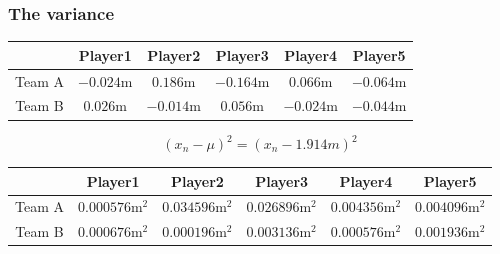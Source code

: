\documentclass[aspectratio=169]{beamer}
\begin{document}
\begin{frame}
    \frametitle{The variance}

    \centering
    \begin{tabular}{ c|ccccc }
        \hline
               & Player1     & Player2     & Player3     & Player4     & Player5     \\
        \hline
        Team A & \(-0.024\)m & \(0.186\)m  & \(-0.164\)m & \(0.066\)m  & \(-0.064\)m \\
        Team B & \(0.026\)m  & \(-0.014\)m & \(0.056\)m  & \(-0.024\)m & \(-0.044\)m \\
        \hline
    \end{tabular}

    \vspace{0.5cm}

    \begin{equation*}
        \left( x_{n}-  \mu  \right) ^{2} =  \left( x_{n}- 1.914m \right) ^{2}
    \end{equation*}

    \vspace{0.5cm}

    \begin{tabular}{ c|ccccc }
        \hline
               & Player1               & Player2               & Player3               & Player4               & Player5               \\
        \hline
        Team A & \(0.000576\)m\(^{2}\) & \(0.034596\)m\(^{2}\) & \(0.026896\)m\(^{2}\) & \(0.004356\)m\(^{2}\) & \(0.004096\)m\(^{2}\) \\
        Team B & \(0.000676\)m\(^{2}\) & \(0.000196\)m\(^{2}\) & \(0.003136\)m\(^{2}\) & \(0.000576\)m\(^{2}\) & \(0.001936\)m\(^{2}\) \\
        \hline
    \end{tabular}

\end{frame}
\end{document}
